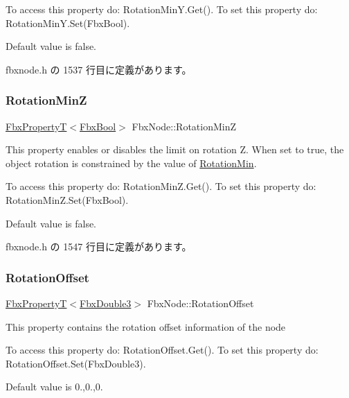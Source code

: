 To access this property do\+: Rotation\+Min\+Y.\+Get(). To set this property do\+: Rotation\+Min\+Y.\+Set(\+Fbx\+Bool).

Default value is false. 

 fbxnode.\+h の 1537 行目に定義があります。

\mbox{\label{class_fbx_node_ab78b8c903c7104974ff2567dbc43f3cf}} 
\subsubsection{\texorpdfstring{Rotation\+MinZ}{RotationMinZ}}
{\footnotesize\ttfamily \hyperlink{class_fbx_property_t}{Fbx\+PropertyT}$<$\hyperlink{fbxtypes_8h_a92e0562b2fe33e76a242f498b362262e}{Fbx\+Bool}$>$ Fbx\+Node\+::\+Rotation\+MinZ}

This property enables or disables the limit on rotation Z. When set to {\ttfamily true}, the object rotation is constrained by the value of \hyperlink{class_fbx_node_a186dc96c347a68ff32eb1641f02c70c8}{Rotation\+Min}.

To access this property do\+: Rotation\+Min\+Z.\+Get(). To set this property do\+: Rotation\+Min\+Z.\+Set(\+Fbx\+Bool).

Default value is false. 

 fbxnode.\+h の 1547 行目に定義があります。

\mbox{\label{class_fbx_node_a2e5e9ab154369d18c2495b52990436ea}} 
\subsubsection{\texorpdfstring{Rotation\+Offset}{RotationOffset}}
{\footnotesize\ttfamily \hyperlink{class_fbx_property_t}{Fbx\+PropertyT}$<$\hyperlink{fbxtypes_8h_ae0a96f14cde566774c7553aa7523b7a7}{Fbx\+Double3}$>$ Fbx\+Node\+::\+Rotation\+Offset}

This property contains the rotation offset information of the node

To access this property do\+: Rotation\+Offset.\+Get(). To set this property do\+: Rotation\+Offset.\+Set(\+Fbx\+Double3).

Default value is 0.,0.,0. 

